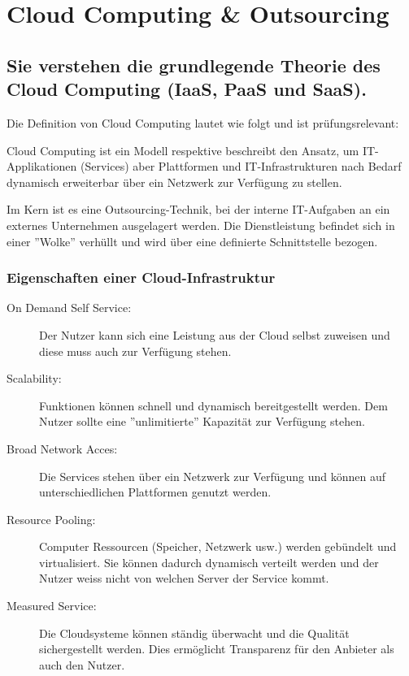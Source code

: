 \chapter{Cloud Computing \& Outsourcing}

\section{Sie verstehen die grundlegende Theorie des Cloud Computing (IaaS, PaaS und SaaS).}

Die Definition von Cloud Computing lautet wie folgt und ist prüfungsrelevant:
\begin{displayquote}
	Cloud Computing ist ein Modell respektive beschreibt den Ansatz, um IT-Applikationen (Services) aber Plattformen und IT-Infrastrukturen nach Bedarf dynamisch erweiterbar über ein Netzwerk zur Verfügung zu stellen.
\end{displayquote}
Im Kern ist es eine Outsourcing-Technik, bei der interne IT-Aufgaben an ein externes Unternehmen ausgelagert werden. Die Dienstleistung befindet sich in einer ''Wolke'' verhüllt und wird über eine definierte Schnittstelle bezogen.

\subsection{Eigenschaften einer Cloud-Infrastruktur}
\begin{description}
	\item[On Demand Self Service:] Der Nutzer kann sich eine Leistung aus der Cloud selbst zuweisen und diese muss auch zur Verfügung stehen.
	\item[Scalability:] Funktionen können schnell und dynamisch bereitgestellt werden. Dem Nutzer sollte eine ''unlimitierte'' Kapazität zur Verfügung stehen.
	\item[Broad Network Acces:] Die Services stehen über ein Netzwerk zur Verfügung und können auf unterschiedlichen Plattformen genutzt werden.
	\item[Resource Pooling:] Computer Ressourcen (Speicher, Netzwerk usw.) werden gebündelt und virtualisiert. Sie können dadurch dynamisch verteilt werden und der Nutzer weiss nicht von welchen Server der Service kommt.
	\item[Measured Service:] Die Cloudsysteme können ständig überwacht und die Qualität sichergestellt werden. Dies ermöglicht Transparenz für den Anbieter als auch den Nutzer.
\end{description}

